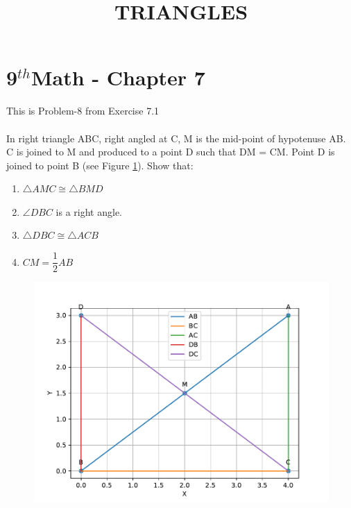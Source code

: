 \documentclass[10pt]{article}
\begin{document}
\begin{center}
\title{\textbf{TRIANGLES}}
\date{\vspace{-5ex}}
\maketitle
\end{center}
\section*{9$^{th}$Math - Chapter 7}
This is Problem-8 from Exercise 7.1\\\\
In right triangle ABC, right angled at C, M is the mid-point of hypotenuse AB. C is joined to M and produced to a point D such that DM = CM. Point D is joined to point B (see Figure \ref{fig:1}). Show that:
\begin{enumerate}
\item $\triangle AMC \cong \triangle BMD$
\item $\angle DBC$ is a right angle.
\item $\triangle DBC \cong \triangle ACB$
\item $CM = \dfrac{1}{2}AB$
\end{enumerate}

\begin{figure}[!h]
	\begin{center}
		\includegraphics[width=\columnwidth]{./figs/fig.pdf}
	\end{center}
\caption{}
\label{fig:1}
\end{figure}
\end{document}
